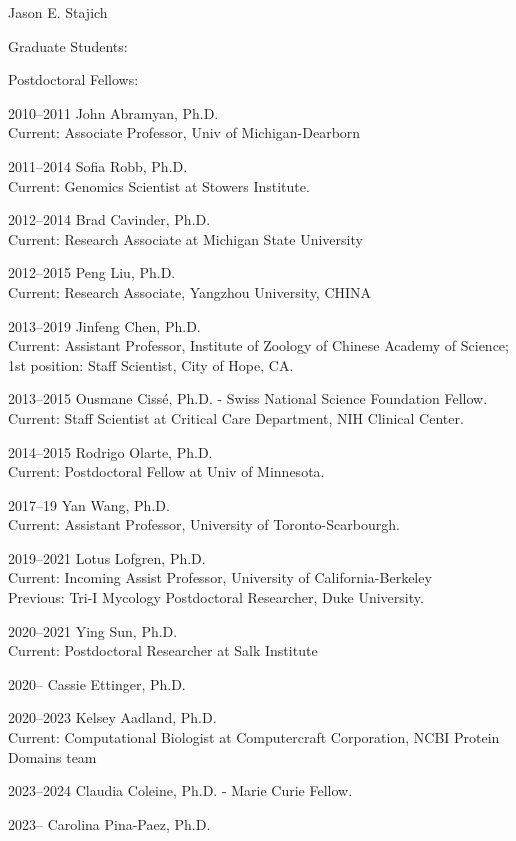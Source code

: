 \documentclass[10pt]{article}
\begin{document}
\begin{cv}{\centerline{Jason E. Stajich}}
\begin{cvlistcompact}{Graduate Students:}
\end{cvlistcompact}

\begin{cvlistcompact}{Postdoctoral Fellows:}
\item [2010--2011] John Abramyan, Ph.D. \\
  Current: Associate Professor, Univ of Michigan-Dearborn
\item [2011--2014] Sofia Robb, Ph.D. \\
  Current: Genomics Scientist at Stowers Institute.
\item [2012--2014] Brad Cavinder, Ph.D. \\
  Current: Research Associate at Michigan State University
\item [2012--2015] Peng Liu, Ph.D. \\
  Current: Research Associate, Yangzhou University, CHINA
\item [2013--2019] Jinfeng Chen, Ph.D. \\
Current: Assistant Professor, Institute of Zoology of Chinese Academy of Science; 1st position: Staff Scientist, City of Hope, CA.
\item [2013--2015] Ousmane Ciss\'{e}, Ph.D. - Swiss National Science Foundation Fellow. \\
  Current: Staff Scientist at Critical Care Department, NIH Clinical Center.
\item [2014--2015] Rodrigo Olarte, Ph.D. \\
  Current: Postdoctoral Fellow at Univ of Minnesota.
\item [2017--19] Yan Wang, Ph.D. \\
  Current: Assistant Professor, University of Toronto-Scarbourgh.
\item [2019--2021] Lotus Lofgren, Ph.D. \\
  Current: Incoming Assist Professor, University of California-Berkeley \\
  Previous: Tri-I Mycology Postdoctoral Researcher, Duke University.
\item [2020--2021] Ying Sun, Ph.D. \\
Current: Postdoctoral Researcher at Salk Institute
\item [2020--] Cassie Ettinger, Ph.D.
\item [2020--2023] Kelsey Aadland, Ph.D.  \\
Current: Computational Biologist at Computercraft Corporation, NCBI Protein Domains team
\item [2023--2024] Claudia Coleine, Ph.D. - Marie Curie Fellow.
\item [2023--] Carolina Pina-Paez, Ph.D.
\end{cvlistcompact}


\end{cv}
\end{document}
